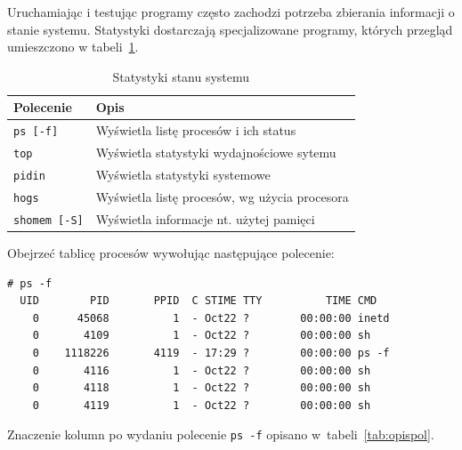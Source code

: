 \begin{example}

Uruchamiając i testując programy często zachodzi potrzeba zbierania informacji o stanie systemu. Statystyki dostarczają specjalizowane programy, których przegląd umieszczono w tabeli~\ref{tab:statystyki}. 

\begin{table}[h!]
\centering
\caption{Statystyki stanu systemu}
\setlength{\arrayrulewidth}{1pt}
\setlength{\tabcolsep}{6pt}
\renewcommand{\arraystretch}{1.2}
\begin{tabular}{ |p{}|p{}|}
\hline \rowcolor{gray}
\textbf{Polecenie} & \textbf{Opis} \\ \hline
\mbox{\lstinline[style=MyBashStyle]{ps [-f]}} & Wyświetla listę procesów i ich status \\ \hline 
\mbox{\lstinline[style=MyBashStyle]{top}} & Wyświetla statystyki wydajnościowe sytemu \\ \hline 
\mbox{\lstinline[style=MyBashStyle]{pidin}}  & Wyświetla statystyki systemowe \\ \hline
\mbox{\lstinline[style=MyBashStyle]{hogs}}  & Wyświetla listę procesów, wg użycia procesora \\ \hline
\mbox{\lstinline[style=MyBashStyle]{shomem [-S]}}  & Wyświetla informacje nt. użytej pamięci \\ \hline
\end{tabular}
\label{tab:statystyki}
\end{table}

Obejrzeć tablicę procesów wywołując następujące polecenie: 
\begin{lstlisting}[style=MyBashStyle,deletekeywords={ps}] 
# ps -f
  UID        PID       PPID  C STIME TTY          TIME CMD
    0      45068          1  - Oct22 ?        00:00:00 inetd
    0       4109          1  - Oct22 ?        00:00:00 sh
    0    1118226       4119  - 17:29 ?        00:00:00 ps -f
    0       4116          1  - Oct22 ?        00:00:00 sh
    0       4118          1  - Oct22 ?        00:00:00 sh
    0       4119          1  - Oct22 ?        00:00:00 sh
\end{lstlisting}

Znaczenie kolumn po wydaniu polecenie \lstinline[style=MyBashStyle]{ps -f} opisano w~tabeli~\ref{tab:opispol}.


\end{example}
